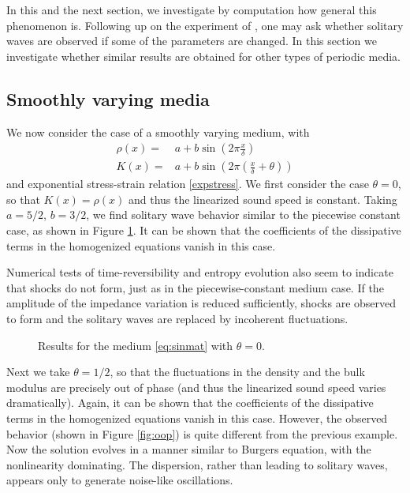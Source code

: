 In this and the next section, we investigate by computation how general this
phenomenon is.  Following up on the experiment of \cite{leveque2003},
one may ask whether solitary waves are observed if some of the parameters are
changed.  In this section we investigate whether similar results are obtained
for other types of periodic media.

\subsection{Smoothly varying media}
We now consider the case of a smoothly varying medium, with
\begin{subequations}
\label{eq:sinmat}
\begin{align}
\rho(x) = & a + b \sin\left(2\pi \frac{x}{\delta}\right) \\
K(x) = & a + b \sin\left(2\pi\left(\frac{x}{\delta}+\theta\right)\right)
\end{align}
\end{subequations}
and exponential stress-strain relation \ref{expstress}.
We first consider the case $\theta=0$, so that $K(x)=\rho(x)$ and thus
the linearized sound speed is constant.  Taking $a=5/2$, $b=3/2$, we find solitary
wave behavior similar to the piecewise constant case, as shown in Figure
\ref{fig:sinoton}.  It can be shown that the coefficients of the dissipative
terms in the homogenized equations vanish in this case.

Numerical tests of time-reversibility and entropy evolution also seem
to indicate that shocks do not form, just as in the piecewise-constant
medium case.  If the amplitude of the impedance variation is reduced
sufficiently, shocks are observed to form and the solitary waves are
replaced by incoherent fluctuations.
\begin{figure}
\begin{center}
\caption{Results for the medium \eqref{eq:sinmat} with $\theta=0$. \label{fig:sinoton}}
\end{center}
\end{figure}

Next we take $\theta=1/2$, so that the fluctuations in the density and the
bulk modulus are precisely out of phase (and thus the linearized sound speed 
varies dramatically).  Again, it can be shown that the coefficients of the 
dissipative terms in the homogenized equations vanish in this case.  However, the 
observed behavior (shown in Figure \ref{fig:oop}) is quite different from 
the previous example.  Now the
solution evolves in a manner similar to Burgers equation, with the nonlinearity
dominating.  The dispersion, rather than leading to solitary waves, appears only
to generate noise-like oscillations.

